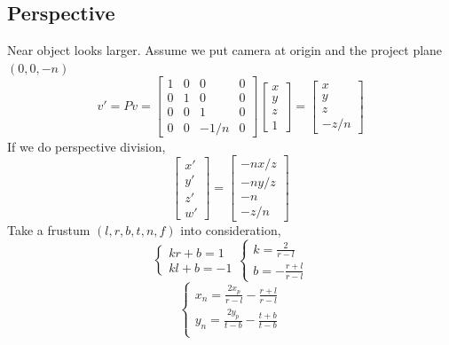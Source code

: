 \documentclass{article}
\begin{document}
\subsection*{Perspective}
Near object looks larger.
Assume we put camera at origin and the project plane \((0, 0, -n)\)
\[v{'} = Pv = \begin{bmatrix}
    1 &0 &0 &0 \\
    0 &1 &0 &0 \\
    0 &0 &1 &0 \\
    0 &0 &-1/n &0
\end{bmatrix}\begin{bmatrix}
    x \\ y \\ z \\ 1
\end{bmatrix} = \begin{bmatrix}
    x \\ y \\ z \\ -z/n
\end{bmatrix}\]
If we do perspective division,
\[\begin{bmatrix}
    x{'} \\ y{'} \\ z{'} \\ w'
\end{bmatrix} = \begin{bmatrix}
    -nx/z \\ -ny/z \\ -n \\ -z/n
\end{bmatrix}\]
Take a frustum \((l, r, b, t, n, f)\) into consideration,
\begin{equation}
    \begin{cases}
        kr+b = 1 \\
        kl+b = -1
    \end{cases}
    \begin{cases}
        k = \frac{2}{r-l} \\
        b = -\frac{r+l}{r-l}
    \end{cases}
\end{equation}
\begin{equation}
    \begin{cases}
        x_{n} = \frac{2x_{p}}{r-l} - \frac{r+l}{r-l} \\
        y_{n} = \frac{2y_{p}}{t-b} - \frac{t+b}{t-b} \\
    \end{cases}
\end{equation}
\end{document}

